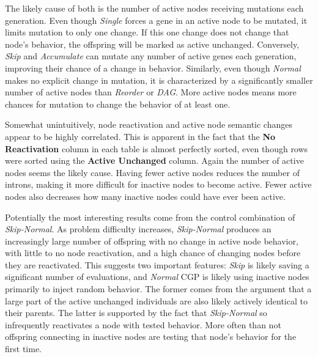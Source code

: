 \documentclass[journal]{IEEEtran}
\begin{document}
The likely cause of both is the number
of active nodes receiving mutations each generation.  Even though \emph{Single}
forces a gene in an active node to be mutated, it limits mutation to only one change.
If this one change does not change that node's behavior, the offspring will be marked
as active unchanged.  Conversely, \emph{Skip} and \emph{Accumulate} can mutate any
number of active genes each generation, improving their chance of a change in behavior.
Similarly, even though \emph{Normal} makes no explicit change in mutation, it is characterized
by a significantly smaller number of active nodes than \emph{Reorder} or \emph{DAG}.  More
active nodes means more chances for mutation to change the behavior of at least one.

Somewhat unintuitively, node reactivation and active node semantic changes appear
to be highly correlated.  This is apparent in the fact that the \textbf{No Reactivation}
column in each table is almost perfectly sorted, even though rows were sorted using the
\textbf{Active Unchanged} column.  Again the number of active nodes seems the likely
cause.  Having fewer active nodes reduces the number of introns, making it more
difficult for inactive nodes to become active.  Fewer active nodes also decreases
how many inactive nodes could have ever been active.

Potentially the most interesting results come from the control combination of
\emph{Skip-Normal}.  As problem difficulty increases, \emph{Skip-Normal} produces
an increasingly large number of offspring with no change in active node behavior,
with little to no node reactivation, and a high chance of changing nodes before
they are reactivated.  This suggests two important features: \emph{Skip} is likely
saving a significant number of evaluations, and \emph{Normal} CGP is likely using
inactive nodes primarily to inject random behavior.  The former comes from the
argument that a large part of the active unchanged individuals are also likely
actively identical to their parents.  The latter is supported by the fact that
\emph{Skip-Normal} so infrequently reactivates a node with tested behavior.  More
often than not offspring connecting in inactive nodes are testing that node's behavior
for the first time.
\end{document}
